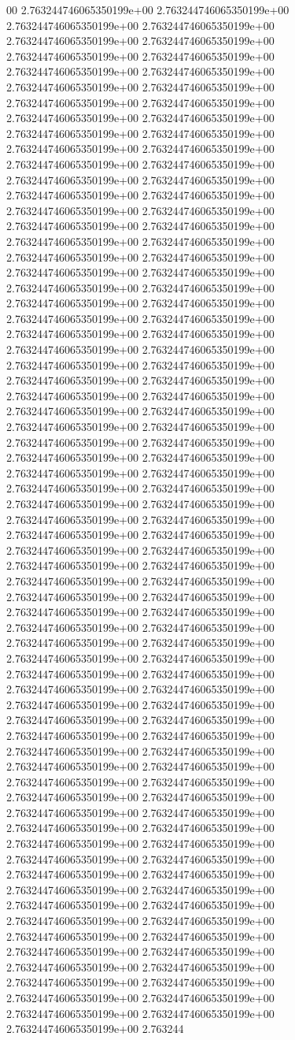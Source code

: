 00	2.763244746065350199e+00	2.763244746065350199e+00	2.763244746065350199e+00	2.763244746065350199e+00	2.763244746065350199e+00	2.763244746065350199e+00	2.763244746065350199e+00	2.763244746065350199e+00	2.763244746065350199e+00	2.763244746065350199e+00	2.763244746065350199e+00	2.763244746065350199e+00	2.763244746065350199e+00	2.763244746065350199e+00	2.763244746065350199e+00	2.763244746065350199e+00	2.763244746065350199e+00	2.763244746065350199e+00	2.763244746065350199e+00	2.763244746065350199e+00	2.763244746065350199e+00	2.763244746065350199e+00	2.763244746065350199e+00	2.763244746065350199e+00	2.763244746065350199e+00	2.763244746065350199e+00	2.763244746065350199e+00	2.763244746065350199e+00	2.763244746065350199e+00	2.763244746065350199e+00	2.763244746065350199e+00	2.763244746065350199e+00	2.763244746065350199e+00	2.763244746065350199e+00	2.763244746065350199e+00	2.763244746065350199e+00	2.763244746065350199e+00	2.763244746065350199e+00	2.763244746065350199e+00	2.763244746065350199e+00	2.763244746065350199e+00	2.763244746065350199e+00	2.763244746065350199e+00	2.763244746065350199e+00	2.763244746065350199e+00	2.763244746065350199e+00	2.763244746065350199e+00	2.763244746065350199e+00	2.763244746065350199e+00	2.763244746065350199e+00	2.763244746065350199e+00	2.763244746065350199e+00	2.763244746065350199e+00	2.763244746065350199e+00	2.763244746065350199e+00	2.763244746065350199e+00	2.763244746065350199e+00	2.763244746065350199e+00	2.763244746065350199e+00	2.763244746065350199e+00	2.763244746065350199e+00	2.763244746065350199e+00	2.763244746065350199e+00	2.763244746065350199e+00	2.763244746065350199e+00	2.763244746065350199e+00	2.763244746065350199e+00	2.763244746065350199e+00	2.763244746065350199e+00	2.763244746065350199e+00	2.763244746065350199e+00	2.763244746065350199e+00	2.763244746065350199e+00	2.763244746065350199e+00	2.763244746065350199e+00	2.763244746065350199e+00	2.763244746065350199e+00	2.763244746065350199e+00	2.763244746065350199e+00	2.763244746065350199e+00	2.763244746065350199e+00	2.763244746065350199e+00	2.763244746065350199e+00	2.763244746065350199e+00	2.763244746065350199e+00	2.763244746065350199e+00	2.763244746065350199e+00	2.763244746065350199e+00	2.763244746065350199e+00	2.763244746065350199e+00	2.763244746065350199e+00	2.763244746065350199e+00	2.763244746065350199e+00	2.763244746065350199e+00	2.763244746065350199e+00	2.763244746065350199e+00	2.763244746065350199e+00	2.763244746065350199e+00	2.763244746065350199e+00	2.763244746065350199e+00	2.763244746065350199e+00	2.763244746065350199e+00	2.763244746065350199e+00	2.763244746065350199e+00	2.763244746065350199e+00	2.763244746065350199e+00	2.763244746065350199e+00	2.763244746065350199e+00	2.763244746065350199e+00	2.763244746065350199e+00	2.763244746065350199e+00	2.763244746065350199e+00	2.763244746065350199e+00	2.763244746065350199e+00	2.763244746065350199e+00	2.763244746065350199e+00	2.763244746065350199e+00	2.763244746065350199e+00	2.763244746065350199e+00	2.763244746065350199e+00	2.763244746065350199e+00	2.763244746065350199e+00	2.763244746065350199e+00	2.763244746065350199e+00	2.763244746065350199e+00	2.763244746065350199e+00	2.763244746065350199e+00	2.763244746065350199e+00	2.763244746065350199e+00	2.763244746065350199e+00	2.763244746065350199e+00	2.763244746065350199e+00	2.763244746065350199e+00	2.763244
